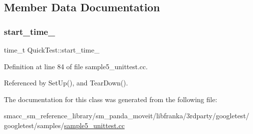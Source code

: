 \subsection{Member Data Documentation}
\mbox{\label{classQuickTest_aba6a28bbd733e72e3b088a0b66386809}} 
\subsubsection{\texorpdfstring{start\+\_\+time\+\_\+}{start\_time\_}}
{\footnotesize\ttfamily time\+\_\+t Quick\+Test\+::start\+\_\+time\+\_\+\hspace{0.3cm}{\ttfamily [protected]}}



Definition at line 84 of file sample5\+\_\+unittest.\+cc.



Referenced by Set\+Up(), and Tear\+Down().



The documentation for this class was generated from the following file\+:\begin{DoxyCompactItemize}
\item 
smacc\+\_\+sm\+\_\+reference\+\_\+library/sm\+\_\+panda\+\_\+moveit/libfranka/3rdparty/googletest/googletest/samples/\hyperlink{sample5__unittest_8cc}{sample5\+\_\+unittest.\+cc}\end{DoxyCompactItemize}
